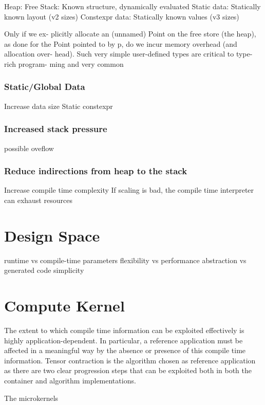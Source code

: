 \documentclass[conference]{IEEEtran}
\begin{document}
Heap: Free
Stack: Known structure, dynamically evaluated
Static data: Statically known layout (v2 sizes)
Constexpr data: Statically known values (v3 sizes)


Only if we ex-
plicitly allocate an (unnamed) Point on the free store (the heap), as done for
the Point pointed to by p, do we incur memory overhead (and allocation over-
head). Such very simple user-defined types are critical to type-rich program-
ming and very common
\cite[p.~3]{stroustrup_foundations_2011}

\subsubsection{Static/Global Data}
Increase data size
    Static constexpr

\subsubsection{Increased stack pressure}
possible oveflow

\subsubsection{Reduce indirections from heap to the stack}

Increase compile time complexity
    If scaling is bad, the compile time interpreter can exhaust resources

\section{Design Space}
runtime vs compile-time parameters
flexibility vs performance
abstraction vs generated code simplicity

\section{Compute Kernel}

The extent to which compile time information can be exploited effectively is
highly application-dependent.
In particular, a reference application must be affected in a meaningful way by
the absence or presence of this compile time information.
Tensor contraction is the algorithm chosen as reference application as there are
two clear progression steps that can be exploited both in both the container and
algorithm implementations.

\cite{hendricks_lessons_2025}

The microkernels
\end{document}
